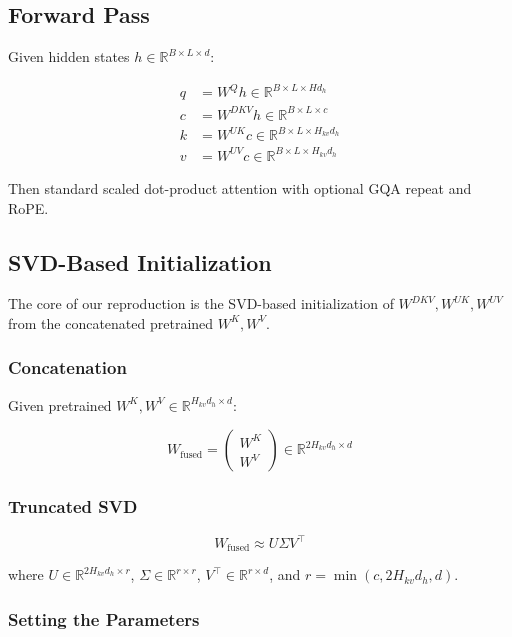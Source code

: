 \subsection{Forward Pass}

Given hidden states $h \in \mathbb{R}^{B \times L \times d}$:

\[
\begin{aligned}
q &= W^Q h \in \mathbb{R}^{B \times L \times H d_h} \\
c &= W^{DKV} h \in \mathbb{R}^{B \times L \times c} \\
k &= W^{UK} c \in \mathbb{R}^{B \times L \times H_{kv} d_h} \\
v &= W^{UV} c \in \mathbb{R}^{B \times L \times H_{kv} d_h}
\end{aligned}
\tag{4.1}
\]

Then standard scaled dot-product attention with optional GQA repeat and 
RoPE.

\subsection{SVD-Based Initialization}

The core of our reproduction is the SVD-based initialization of 
$W^{DKV}, W^{UK}, W^{UV}$ from the concatenated pretrained $W^K, W^V$.

\subsubsection{Concatenation}

Given pretrained $W^K, W^V \in \mathbb{R}^{H_{kv} d_h \times d}$:

\[
W_\text{fused} = \begin{pmatrix} W^K \\ W^V \end{pmatrix} \in \mathbb{R}^{2 H_{kv} d_h \times d}
\tag{4.2}
\]

\subsubsection{Truncated SVD}

\[
W_\text{fused} \approx U \Sigma V^\top
\tag{4.3}
\]

where $U \in \mathbb{R}^{2 H_{kv} d_h \times r}$, $\Sigma \in \mathbb{R}^{r \times r}$, 
$V^\top \in \mathbb{R}^{r \times d}$, and $r = \min(c, 2 H_{kv} d_h, d)$.

\subsubsection{Setting the Parameters}

